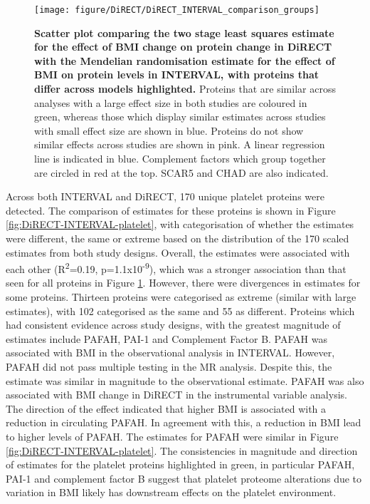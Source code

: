\documentclass[11pt,twoside]{bristolthesis}
\newcommand{\blandscape}{\begin{landscape}}
\newcommand{\elandscape}{\end{landscape}}
\begin{document}
\blandscape



\begin{figure}

{\centering \texttt{[image: figure/DiRECT/DiRECT\_INTERVAL\_comparison\_groups]} 

}

\caption[Scatter plot comparing the two stage least squares estimate for the effect of BMI change on protein change in DiRECT with the Mendelian randomisation estimate for the effect of BMI on protein levels in INTERVAL, with proteins that differ across models highlighted]{\textbf{Scatter plot comparing the two stage least squares estimate for the effect of BMI change on protein change in DiRECT with the Mendelian randomisation estimate for the effect of BMI on protein levels in INTERVAL, with proteins that differ across models highlighted.} Proteins that are similar across analyses with a large effect size in both studies are coloured in green, whereas those which display similar estimates across studies with small effect size are shown in blue. Proteins do not show similar effects across studies are shown in pink. A linear regression line is indicated in blue. Complement factors which group together are circled in red at the top. SCAR5 and CHAD are also indicated.}\label{fig:DiRECT-INTERVAL-group}
\end{figure}
\elandscape

Across both INTERVAL and DiRECT, 170 unique platelet proteins were detected. The comparison of estimates for these proteins is shown in Figure \ref{fig:DiRECT-INTERVAL-platelet}, with categorisation of whether the estimates were different, the same or extreme based on the distribution of the 170 scaled estimates from both study designs. Overall, the estimates were associated with each other (R\textsuperscript{2}=0.19, p=1.1x10\textsuperscript{-9}), which was a stronger association than that seen for all proteins in Figure \ref{fig:DiRECT-INTERVAL-group}. However, there were divergences in estimates for some proteins. Thirteen proteins were categorised as extreme (similar with large estimates), with 102 categorised as the same and 55 as different. Proteins which had consistent evidence across study designs, with the greatest magnitude of estimates include PAFAH, PAI-1 and Complement Factor B. PAFAH was associated with BMI in the observational analysis in INTERVAL. However, PAFAH did not pass multiple testing in the MR analysis. Despite this, the estimate was similar in magnitude to the observational estimate. PAFAH was also associated with BMI change in DiRECT in the instrumental variable analysis. The direction of the effect indicated that higher BMI is associated with a reduction in circulating PAFAH. In agreement with this, a reduction in BMI lead to higher levels of PAFAH. The estimates for PAFAH were similar in Figure \ref{fig:DiRECT-INTERVAL-platelet}. The consistencies in magnitude and direction of estimates for the platelet proteins highlighted in green, in particular PAFAH, PAI-1 and complement factor B suggest that platelet proteome alterations due to variation in BMI likely has downstream effects on the platelet environment.
\end{document}
